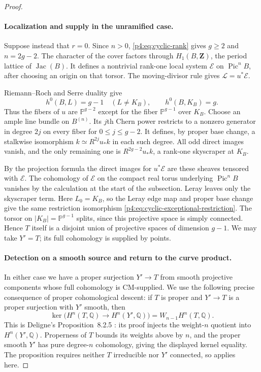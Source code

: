 \documentclass[11pt]{article}
\newcommand{\Q}{\mathbb Q}
\theoremstyle{plain}
\theoremstyle{definition}
\theoremstyle{remark}
\numberwithin{equation}{section}
\begin{document}
\begin{proof}
\paragraph{Localization and supply in the unramified case.}
Suppose instead that $r=0$.  Since $n>0$,
\eqref{p4:eq:cyclic-rank} gives $g\ge2$ and $n=2g-2$.
The character of the cover factors through $H_1(B,\mathbf Z)$,
the period lattice of $\operatorname{Jac}(B)$.  It defines a
nontrivial rank-one local system $\mathcal E$ on
$\operatorname{Pic}^n B$, after choosing an origin on that
torsor.  The moving-divisor rule gives $\mathcal L=u^*\mathcal E$.

Riemann--Roch and Serre duality give
\[
 h^0(B,L)=g-1\quad(L\ne K_B),\qquad h^0(B,K_B)=g.
\]
Thus the fibers of $u$ are $\mathbb P^{g-2}$ except for the
fiber $\mathbb P^{g-1}$ over $K_B$.  Choose an ample line
bundle on $B^{(n)}$.  Its $j$th Chern power restricts to a
nonzero generator in degree $2j$ on every fiber for
$0\le j\le g-2$.  It defines, by proper base change, a
stalkwise isomorphism $k\simeq R^{2j}u_*k$ in each such
degree.  All odd direct images vanish, and the only remaining
one is $R^{2g-2}u_*k$, a rank-one skyscraper at $K_B$.

By the projection formula the direct images for $u^*\mathcal E$
are these sheaves tensored with $\mathcal E$.  The cohomology
of $\mathcal E$ on the compact real torus underlying
$\operatorname{Pic}^n B$ vanishes by the calculation at the
start of the subsection.  Leray leaves only the skyscraper
term.  Here $L_0=K_B$, so the Leray edge map and proper base change
give the same restriction isomorphism
\eqref{p4:eq:cyclic-exceptional-restriction}.
The torsor on
$|K_B|=\mathbb P^{g-1}$ splits, since this projective space
is simply connected.  Hence $T$ itself is a disjoint union
of projective spaces of dimension $g-1$.  We may take $Y'=T$;
its full cohomology is supplied by points.

\paragraph{Detection on a smooth source and return to the curve product.}
In either case we have a proper surjection
$Y'\to T$ from smooth projective components whose full
cohomology is CM-supplied.  We use the following precise
consequence of proper cohomological descent:
if $T$ is proper and $Y'\to T$ is a proper surjection with
$Y'$ smooth, then
\begin{equation}
 \label{p4:eq:cyclic-weight-kernel}
 \ker\big(H^n(T,\Q)\longrightarrow H^n(Y',\Q)\big)
       =W_{n-1}H^n(T,\Q).
\end{equation}
This is Deligne's Proposition~8.2.5
\cite[Proposition~8.2.5, p.~39]{Deligne1974}: its proof
injects the weight-$n$ quotient into $H^n(Y',\Q)$.
Properness of $T$ bounds its weights above by $n$, and the
proper smooth $Y'$ has pure degree-$n$ cohomology, giving the
displayed kernel equality.  The proposition requires neither
$T$ irreducible nor $Y'$ connected, so applies here.


\end{proof}
\end{document}
